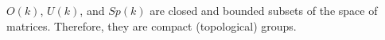 $O(k)$, $U(k)$, and $Sp(k)$ are closed and bounded subsets of the space of matrices. Therefore, they are compact (topological) groups.
